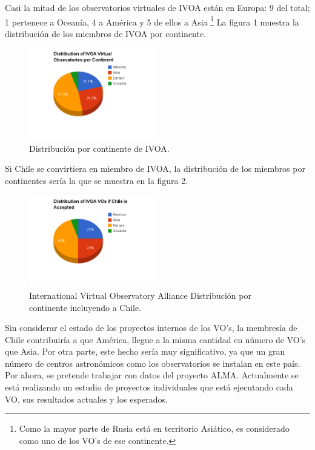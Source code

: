 Casi la mitad de los observatorios virtuales de IVOA están en Europa: 9 del
total; 1 pertenece a Oceanía, 4 a América y 5 de ellos a Asia \footnote{Como la
mayor parte de Rusia está en territorio Asiático, es considerado como uno de
los VO's de ese continente.} La figura 1 muestra la distribución de los
miembros de IVOA por continente.
	\begin{figure}[h!t]
		\begin{center}
			\includegraphics[width=0.5\textwidth]{img/ivoa_vos_distribution.png}
			\caption{Distribución por continente de IVOA.}
		\end{center}
	\end{figure}

Si Chile se convirtiera en miembro de IVOA, la distribución de los miembros
por continentes sería la que se muestra en la figura 2.
	\begin{figure}[h!t]
		\begin{center}
			\includegraphics[width=0.5\textwidth]{img/if_chile_is_accepted.png}
			\caption{International Virtual Observatory Alliance Distribución por continente incluyendo a Chile.}
		\end{center}
	\end{figure}

Sin considerar el estado de los proyectos internos de los VO's, 
la membresía de Chile contribuiría a que América, llegue a la misma
cantidad en número de VO's que Asia. Por otra parte, este
hecho sería muy significativo, ya que un gran número de centros astronómicos
como los observatorios se instalan en este país. Por ahora, se pretende
trabajar con datos del proyecto ALMA. Actualmente se está realizando
un estudio de proyectos individuales que está ejecutando cada VO, sus resultados actuales
y los esperados.
